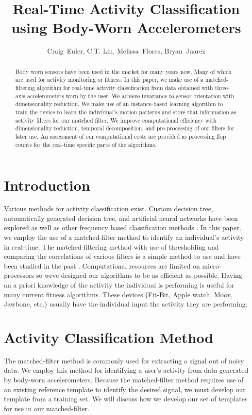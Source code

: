 \documentclass[journal]{IEEEtran}
\begin{document}
%
\title{Real-Time Activity Classification using Body-Worn Accelerometers}
%
\author{Craig~Euler, C.T. Lin, Melissa~Flores, Bryan~Juarez}
%
\maketitle
%
\begin{abstract}
Body worn sensors have been used in the market for many years now.
Many of which are used for activity monitoring or fitness.
In this paper, we make use of a matched-filtering algorithm for real-time activity classification from data obtained with three-axis accelerometers worn by the user.
We achieve invariance to sensor orientation with dimensionality reduction.
We make use of an instance-based learning algorithm to train the device to learn the individual's motion patterns and store that information as activity filters for our matched filter.
We improve computational efficiency with dimensionality reduction, temporal decomposition, and pre-processing of our filters for later use.
An assessment of our computational costs are provided as processing flop counts for the real-time specific parts of the algorithms.
\end{abstract}
%
\section{Introduction}
Various methods for activity classification exist.
Custom decision tree, automatically generated decision tree, and artificial neural networks \cite{parkka_ermes_korpipaa_mantyjarvi_peltola_korhonen_2006} have been explored as well as other frequency based classification methods \cite{sharma_purwar_lee_lee_chung_2008}.
In this paper, we employ the use of a matched-filter method to identify an individual’s activity in real-time.
The matched-filtering method with use of thresholding and comparing the correlations of various filters is a simple method to use and have been studied in the past \cite{giannakis_tsatsanis_1990}.
Computational resources are limited on micro-processors so we\textquotesingle ve designed our algorithms to be as efficient as possible.
Having an a priori knowledge of the activity the individual is performing is useful for many current fitness algorithms.
These devices (Fit-Bit, Apple watch, Moov, Jawbone, etc.) usually have the individual input the activity they are performing.
%
\section{Activity Classification Method}
The matched-filter method is commonly used for extracting a signal out of noisy data.
We employ this method for identifying a user’s activity from data generated by body-worn accelerometers.
Because the matched-filter method requires use of an existing reference template to identify the desired signal, we must develop our template from a training set.
We will discuss how we develop our set of templates for use in our matched-filter.
\end{document}
